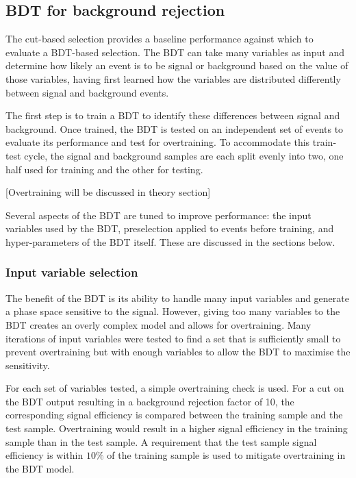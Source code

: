 \subsection{\acs{BDT} for background rejection}

The cut-based selection provides a baseline performance against which to
evaluate a \ac{BDT}-based selection. The \ac{BDT} can take many variables as
input and determine how likely an event is to be signal or background based on
the value of those variables, having first learned how the variables are
distributed differently between signal and background events.

The first step is to train a \ac{BDT} to identify these differences between
signal and background. Once trained, the \ac{BDT} is tested on an independent
set of events to evaluate its performance and test for overtraining.
To accommodate this train-test cycle, the signal and background samples are each
split evenly into two, one half used for training and the other for testing.

[Overtraining will be discussed in theory section]

Several aspects of the \ac{BDT} are tuned to improve performance: the input
variables used by the \ac{BDT}, preselection applied to events before training,
and hyper-parameters of the \ac{BDT} itself. These are discussed in the sections
below.

\subsubsection{Input variable selection}
\label{sec:vzy-bdt-variables}

The benefit of the \ac{BDT} is its ability to handle many input variables and
generate a phase space sensitive to the signal. However, giving too many
variables to the \ac{BDT} creates an overly complex model and allows for
overtraining. Many iterations of input variables were tested to find a set that
is sufficiently small to prevent overtraining but with enough variables to allow
the \ac{BDT} to maximise the sensitivity.

For each set of variables tested, a simple overtraining check is used. For a
cut on the \ac{BDT} output resulting in a background rejection factor of 10, the
corresponding signal efficiency is compared between the training sample and the
test sample. Overtraining would result in a higher signal efficiency in the
training sample than in the test sample. A requirement that the test sample
signal efficiency is within $10\%$ of the training sample is used to mitigate
overtraining in the \ac{BDT} model.

